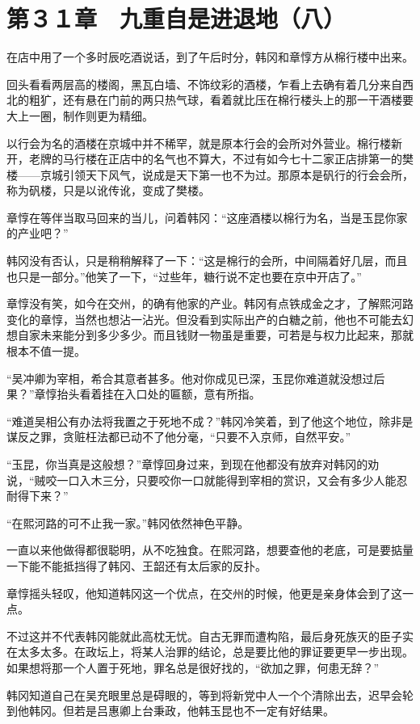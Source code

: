 \section{第３１章　九重自是进退地（八）}

在店中用了一个多时辰吃酒说话，到了午后时分，韩冈和章惇方从棉行楼中出来。

回头看看两层高的楼阁，黑瓦白墙、不饰纹彩的酒楼，乍看上去确有着几分来自西北的粗犷，还有悬在门前的两只热气球，看着就比压在棉行楼头上的那一干酒楼要大上一圈，制作则更为精细。

以行会为名的酒楼在京城中并不稀罕，就是原本行会的会所对外营业。棉行楼新开，老牌的马行楼在正店中的名气也不算大，不过有如今七十二家正店排第一的樊楼——京城引领天下风气，说成是天下第一也不为过。那原本是矾行的行会会所，称为矾楼，只是以讹传讹，变成了樊楼。

章惇在等伴当取马回来的当儿，问着韩冈：“这座酒楼以棉行为名，当是玉昆你家的产业吧？”

韩冈没有否认，只是稍稍解释了一下：“这是棉行的会所，中间隔着好几层，而且也只是一部分。”他笑了一下，“过些年，糖行说不定也要在京中开店了。”

章惇没有笑，如今在交州，的确有他家的产业。韩冈有点铁成金之才，了解熙河路变化的章惇，当然也想沾一沾光。但没看到实际出产的白糖之前，他也不可能去幻想自家未来能分到多少多少。而且钱财一物虽是重要，可若是与权力比起来，那就根本不值一提。

“吴冲卿为宰相，希合其意者甚多。他对你成见已深，玉昆你难道就没想过后果？”章惇抬头看着挂在入口处的匾额，意有所指。

“难道吴相公有办法将我置之于死地不成？”韩冈冷笑着，到了他这个地位，除非是谋反之罪，贪赃枉法都已动不了他分毫，“只要不入京师，自然平安。”

“玉昆，你当真是这般想？”章惇回身过来，到现在他都没有放弃对韩冈的劝说，“贼咬一口入木三分，只要咬你一口就能得到宰相的赏识，又会有多少人能忍耐得下来？”

“在熙河路的可不止我一家。”韩冈依然神色平静。

一直以来他做得都很聪明，从不吃独食。在熙河路，想要查他的老底，可是要掂量一下能不能抵挡得了韩冈、王韶还有太后家的反扑。

章惇摇头轻叹，他知道韩冈这一个优点，在交州的时候，他更是亲身体会到了这一点。

不过这并不代表韩冈能就此高枕无忧。自古无罪而遭构陷，最后身死族灭的臣子实在太多太多。在政坛上，将某人治罪的结论，总是要比他的罪证要更早一步出现。如果想将那一个人置于死地，罪名总是很好找的，“欲加之罪，何患无辞？”

韩冈知道自己在吴充眼里总是碍眼的，等到将新党中人一个个清除出去，迟早会轮到他韩冈。但若是吕惠卿上台秉政，他韩玉昆也不一定有好结果。

